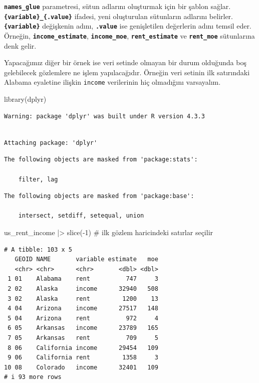 \documentclass[
  letterpaper,
  DIV=11,
  numbers=noendperiod]{scrreprt}
\newenvironment{Shaded}{\begin{snugshade}}{\end{snugshade}}
\newcommand{\CommentTok}[1]{\textcolor[rgb]{0.37,0.37,0.37}{#1}}
\newcommand{\DecValTok}[1]{\textcolor[rgb]{0.68,0.00,0.00}{#1}}
\newcommand{\FunctionTok}[1]{\textcolor[rgb]{0.28,0.35,0.67}{#1}}
\newcommand{\NormalTok}[1]{\textcolor[rgb]{0.00,0.23,0.31}{#1}}
\newcommand{\SpecialCharTok}[1]{\textcolor[rgb]{0.37,0.37,0.37}{#1}}
\begin{document}
\textbf{\texttt{names\_glue}} parametresi, sütun adlarını oluşturmak
için bir şablon sağlar. \textbf{\texttt{\{variable\}\_\{.value\}}}
ifadesi, yeni oluşturulan sütunların adlarını belirler.
\textbf{\texttt{\{variable\}}} değişkenin adını,
\textbf{\texttt{.value}} ise genişletilen değerlerin adını temsil eder.
Örneğin, \textbf{\texttt{income\_estimate}},
\textbf{\texttt{income\_moe}}, \textbf{\texttt{rent\_estimate}} ve
\textbf{\texttt{rent\_moe}} sütunlarına denk gelir.

Yapacağımız diğer bir örnek ise veri setinde olmayan bir durum olduğunda
boş gelebilecek gözlemlere ne işlem yapılacağıdır. Örneğin veri setinin
ilk satırındaki Alabama eyaletine ilişkin \texttt{income} verilerinin
hiç olmadığını varsayalım.

\begin{Shaded}
\begin{Highlighting}[]
\FunctionTok{library}\NormalTok{(dplyr)}
\end{Highlighting}
\end{Shaded}

\begin{verbatim}
Warning: package 'dplyr' was built under R version 4.3.3
\end{verbatim}

\begin{verbatim}

Attaching package: 'dplyr'
\end{verbatim}

\begin{verbatim}
The following objects are masked from 'package:stats':

    filter, lag
\end{verbatim}

\begin{verbatim}
The following objects are masked from 'package:base':

    intersect, setdiff, setequal, union
\end{verbatim}

\begin{Shaded}
\begin{Highlighting}[]
\NormalTok{us\_rent\_income }\SpecialCharTok{|\textgreater{}} 
  \FunctionTok{slice}\NormalTok{(}\SpecialCharTok{{-}}\DecValTok{1}\NormalTok{) }\CommentTok{\# ilk gözlem haricindeki satırlar seçilir}
\end{Highlighting}
\end{Shaded}

\begin{verbatim}
# A tibble: 103 x 5
   GEOID NAME       variable estimate   moe
   <chr> <chr>      <chr>       <dbl> <dbl>
 1 01    Alabama    rent          747     3
 2 02    Alaska     income      32940   508
 3 02    Alaska     rent         1200    13
 4 04    Arizona    income      27517   148
 5 04    Arizona    rent          972     4
 6 05    Arkansas   income      23789   165
 7 05    Arkansas   rent          709     5
 8 06    California income      29454   109
 9 06    California rent         1358     3
10 08    Colorado   income      32401   109
# i 93 more rows
\end{verbatim}
\end{document}
